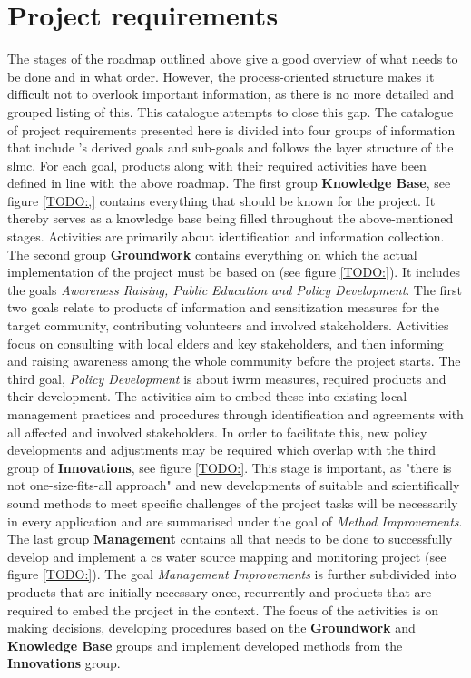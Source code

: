 \section{Project requirements}\label{subsec:project_requirements}


The stages of the roadmap outlined above give a good overview of what needs to be done and in what order. However, the process-oriented structure makes it difficult not to overlook important information, as there is no more detailed and grouped listing of this. This catalogue attempts to close this gap. The catalogue of project requirements presented here is divided into four groups of information that include \autocite{minkmanCitizenScienceWater2015}'s derived goals and sub-goals and follows the layer structure of the \acrshort{slmc}. For each goal, products along with their required activities have been defined in line with the above roadmap. \newline
The first group \textbf{Knowledge Base}, see figure \ref*{TODO:,} contains everything that should be known for the project. It thereby serves as a knowledge base being filled throughout the above-mentioned stages. Activities are primarily about identification and information collection. The second group \textbf{Groundwork} contains everything on which the actual implementation of the project must be based on (see figure \ref*{TODO:}). It includes the goals \textit{Awareness Raising, Public Education and Policy Development}. The first two goals relate to products of information and sensitization measures for the target community, contributing volunteers and involved stakeholders. Activities focus on consulting with local elders and key stakeholders, and then informing and raising awareness among the whole community before the project starts. The third goal, \textit{Policy Development} is about \acrshort{iwrm} measures, required products and their development. The activities aim to embed these into existing local management practices and procedures through identification and agreements with all affected and involved stakeholders. In order to facilitate this, new policy developments and adjustments may be required which overlap with the third group of \textbf{Innovations}, see figure \ref*{TODO:}. This stage is important, as "there is not one-size-fits-all approach" \autocite[2]{fraislCitizenScienceEnvironmental2022} and new developments of suitable and scientifically sound methods to meet specific challenges of the project tasks will be necessarily in every application and are summarised under the goal of \textit{Method Improvements}. The last group \textbf{Management} contains all that needs to be done to successfully develop and implement a \acrshort{cs} water source mapping and monitoring project (see figure \ref*{TODO:}). The goal \textit{Management Improvements} is further subdivided into products that are initially necessary once, recurrently and products that are required to embed the project in the context. The focus of the activities is on making decisions, developing procedures based on the \textbf{Groundwork} and \textbf{Knowledge Base} groups and implement developed methods from the \textbf{Innovations} group.\newline

